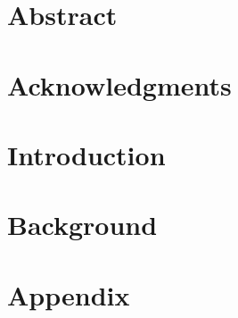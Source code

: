 

\chapter*{Abstract}

\chapter*{Acknowledgments}



\chapter{Introduction}



\chapter{Background}



\chapter{Appendix}






